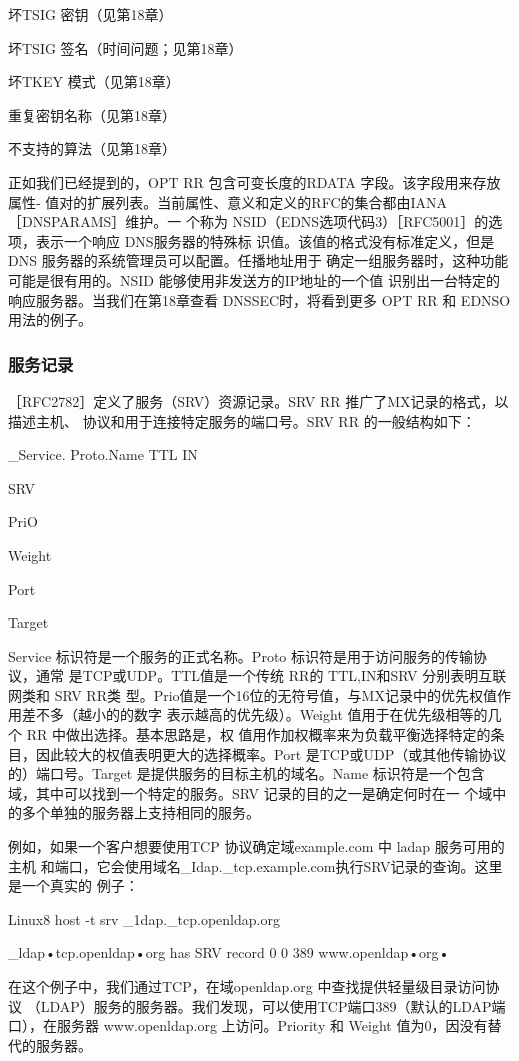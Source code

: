 坏TSIG 密钥（见第18章）

坏TSIG 签名（时间问题；见第18章）

坏TKEY 模式（见第18章）

重复密钥名称（见第18章）

不支持的算法（见第18章）

正如我们已经提到的，OPT RR 包含可变长度的RDATA 字段。该字段用来存放属性-
值对的扩展列表。当前属性、意义和定义的RFC的集合都由IANA［DNSPARAMS］维护。一
个称为 NSID（EDNS选项代码3）［RFC5001］的选项，表示一个响应 DNS服务器的特殊标
识值。该值的格式没有标准定义，但是DNS 服务器的系统管理员可以配置。任播地址用于
确定一组服务器时，这种功能可能是很有用的。NSID 能够使用非发送方的IP地址的一个值
识别出一台特定的响应服务器。当我们在第18章查看 DNSSEC时，将看到更多 OPT RR 和
EDNSO用法的例子。

\subsubsection{服务记录}

［RFC2782］定义了服务（SRV）资源记录。SRV RR 推广了MX记录的格式，以描述主机、
协议和用于连接特定服务的端口号。SRV RR 的一般结构如下：

\_Service. Proto.Name TTL IN

SRV

PriO

Weight

Port

Target

Service 标识符是一个服务的正式名称。Proto 标识符是用于访问服务的传输协议，通常
是TCP或UDP。TTL值是一个传统 RR的 TTL,IN和SRV 分别表明互联网类和 SRV RR类
型。Prio值是一个16位的无符号值，与MX记录中的优先权值作用差不多（越小的的数字
表示越高的优先级）。Weight 值用于在优先级相等的几个 RR 中做出选择。基本思路是，权
值用作加权概率来为负载平衡选择特定的条目，因此较大的权值表明更大的选择概率。Port
是TCP或UDP（或其他传输协议的）端口号。Target 是提供服务的目标主机的域名。Name
标识符是一个包含域，其中可以找到一个特定的服务。SRV 记录的目的之一是确定何时在一
个域中的多个单独的服务器上支持相同的服务。

例如，如果一个客户想要使用TCP 协议确定域example.com 中 ladap 服务可用的主机
和端口，它会使用域名\_Idap.\_tcp.example.com执行SRV记录的查询。这里是一个真实的
例子：

Linux8 host -t srv \_1dap.\_tcp.openldap.org

\_ldap•tcp.openldap•org has SRV record 0 0 389 www.openldap•org•

在这个例子中，我们通过TCP，在域openldap.org 中查找提供轻量级目录访问协议
（LDAP）服务的服务器。我们发现，可以使用TCP端口389（默认的LDAP端口），在服务器
www.openldap.org 上访问。Priority 和 Weight 值为0，因没有替代的服务器。

